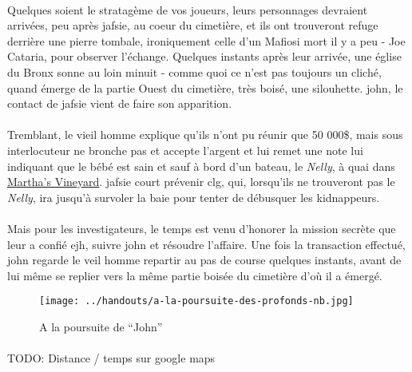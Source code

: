 \paragraph{} Quelques soient le stratagème de vos joueurs, leurs personnages devraient arrivées, peu après \gls{jafsie}, au coeur 
du cimetière, et ils ont trouveront refuge derrière une pierre tombale, ironiquement celle d'un Mafiosi mort il y a peu - Joe Cataria, 
pour observer l'échange. Quelques instants après leur arrivée, une église du Bronx sonne au loin minuit - comme quoi ce n'est pas toujours
un cliché, quand émerge de la partie Ouest du cimetière, très boisé, une silouhette. \gls{john}, le contact de \gls{jafsie} vient de 
faire son apparition.

\paragraph{} Tremblant, le vieil homme explique qu'ils n'ont pu réunir que 50 000\$, mais sous interlocuteur ne bronche pas et accepte 
l'argent et lui remet une note lui indiquant que le bébé est sain et sauf à bord d'un bateau, le \emph{Nelly}, à quai dans 
\href{http://en.wikipedia.org/wiki/Martha\%27s\_Vineyard}{Martha's Vineyard}. \gls{jafsie} court prévenir \gls{clg}, qui, lorsqu'ils ne 
trouveront pas le \emph{Nelly}, ira jusqu'à survoler la baie pour tenter de débusquer les kidnappeurs.

\paragraph{} Mais pour les investigateurs, le temps est venu d'honorer la mission secrète que leur a confié \gls{ejh}, suivre \gls{john} et
résoudre l'affaire. Une fois la transaction effectué, \gls{john} regarde le veil homme repartir au pas de course quelques instants, avant 
de lui même se replier vers la même partie boisée du cimetière d'où il a émergé.

\begin{figure}[h]
 \begin{center}
  \texttt{[image: ../handouts/a-la-poursuite-des-profonds-nb.jpg]}
  \end{center}
\caption{A la poursuite de ``John''}
\end{figure}

\paragraph{} TODO: Distance / temps sur google maps

